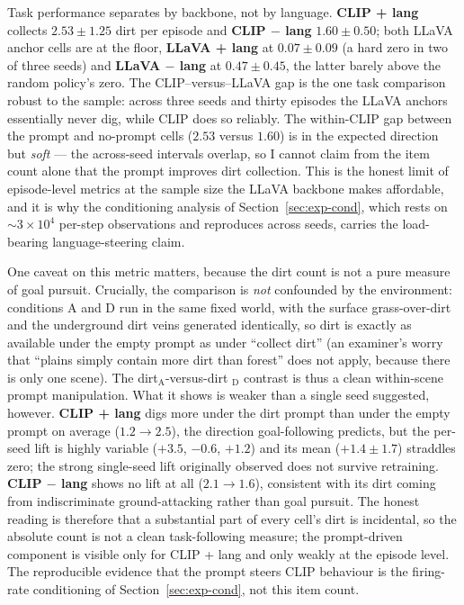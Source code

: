 Task performance separates by backbone, not by language. \textbf{CLIP + lang}
collects $2.53\pm1.25$ dirt per episode and \textbf{CLIP $-$ lang} $1.60\pm0.50$;
both LLaVA anchor cells are at the floor, \textbf{LLaVA + lang} at $0.07\pm0.09$
(a hard zero in two of three seeds) and \textbf{LLaVA $-$ lang} at $0.47\pm0.45$,
the latter barely above the random policy's zero. The CLIP--versus--LLaVA gap is
the one task comparison robust to the sample: across three seeds and thirty
episodes the LLaVA anchors essentially never dig, while CLIP does so reliably.
The within-CLIP gap between the prompt and no-prompt cells ($2.53$ versus $1.60$)
is in the expected direction but \emph{soft} --- the across-seed intervals
overlap, so I cannot claim from the item count alone that the prompt improves
dirt collection. This is the honest limit of episode-level metrics at the sample
size the LLaVA backbone makes affordable, and it is why the conditioning analysis
of Section~\ref{sec:exp-cond}, which rests on ${\sim}3\times10^4$ per-step
observations and reproduces across seeds, carries the load-bearing
language-steering claim.

One caveat on this metric matters, because the dirt count is not a pure measure
of goal pursuit. Crucially, the comparison is \emph{not} confounded by the
environment: conditions A and D run in the same fixed world, with the surface
grass-over-dirt and the underground dirt veins generated identically, so dirt is
exactly as available under the empty prompt as under \enquote{collect dirt} (an
examiner's worry that ``plains simply contain more dirt than forest'' does not
apply, because there is only one scene). The dirt$_{\text{A}}$-versus-dirt
$_{\text{D}}$ contrast is thus a clean within-scene prompt manipulation. What it
shows is weaker than a single seed suggested, however. \textbf{CLIP + lang} digs
more under the dirt prompt than under the empty prompt on average ($1.2\to2.5$),
the direction goal-following predicts, but the per-seed lift is highly variable
($+3.5$, $-0.6$, $+1.2$) and its mean ($+1.4\pm1.7$) straddles zero; the strong
single-seed lift originally observed does not survive retraining. \textbf{CLIP
$-$ lang} shows no lift at all ($2.1\to1.6$), consistent with its dirt coming
from indiscriminate ground-attacking rather than goal pursuit. The honest reading
is therefore that a substantial part of every cell's dirt is incidental, so the
absolute count is not a clean task-following measure; the prompt-driven component
is visible only for CLIP + lang and only weakly at the episode level. The
reproducible evidence that the prompt steers CLIP behaviour is the firing-rate
conditioning of Section~\ref{sec:exp-cond}, not this item count.

